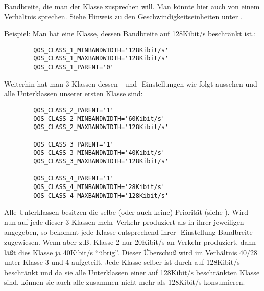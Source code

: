 \begin{description}

   Bandbreite, die man der Klasse zusprechen will. Man könnte hier auch
   von einem Verhältnis sprechen. Siehe Hinweis zu den
   Geschwindigkeitseinheiten unter .

   Beispiel:
   Man hat eine Klasse, dessen Bandbreite auf 128Kibit/s beschränkt ist.:

\begin{example}
\begin{verbatim}
        QOS_CLASS_1_MINBANDWIDTH='128Kibit/s'
        QOS_CLASS_1_MAXBANDWIDTH='128Kibit/s'
        QOS_CLASS_1_PARENT='0'
\end{verbatim}
\end{example}


   Weiterhin hat man 3 Klassen dessen - und
   -Einstellungen wie folgt aussehen und alle
   Unterklassen unserer ersten Klasse sind:

\begin{example}
\begin{verbatim}
        QOS_CLASS_2_PARENT='1'
        QOS_CLASS_2_MINBANDWIDTH='60Kibit/s'
        QOS_CLASS_2_MAXBANDWIDTH='128Kibit/s'

        QOS_CLASS_3_PARENT='1'
        QOS_CLASS_3_MINBANDWIDTH='40Kibit/s'
        QOS_CLASS_3_MAXBANDWIDTH='128Kibit/s'

        QOS_CLASS_4_PARENT='1'
        QOS_CLASS_4_MINBANDWIDTH='28Kibit/s'
        QOS_CLASS_4_MAXBANDWIDTH='128Kibit/s'
\end{verbatim}
\end{example}


   Alle Unterklassen besitzen die selbe (oder auch keine) Priorität
   (siehe ).
   Wird nun auf jede dieser 3 Klassen mehr Verkehr produziert als in
   ihrer jeweiligen  angegeben, so bekommt jede
   Klasse entsprechend ihrer -Einstellung
   Bandbreite zugewiesen.
   Wenn aber z.B. Klasse 2 nur 20Kibit/s an Verkehr produziert, dann läßt
   dies Klasse ja 40Kibit/s ``übrig''. Dieser Überschuß wird im Verhältnis
   40/28 unter Klasse 3 und 4 aufgeteilt.
   Jede Klasse selber ist durch  auf 128Kibit/s
   beschränkt und da sie alle Unterklassen einer auf 128Kibit/s beschränkten
   Klasse sind, können sie auch alle zusammen nicht mehr als 128Kibit/s
   konsumieren.



\end{description}
